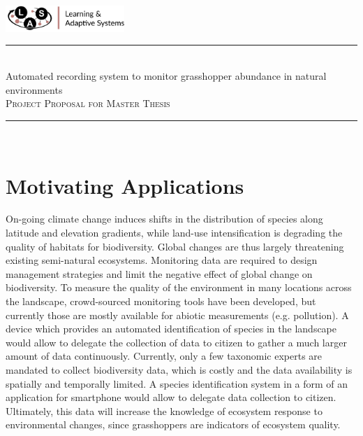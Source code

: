 \documentclass[paper=a4, fontsize=11pt]{scrartcl}
\newcommand{\horrule}[1]{\rule{\linewidth}{#1}}
\begin{document}
\includegraphics[height=1.0cm]{lascropped}%
\hfill%
{
\centering
\normalfont \normalsize 
\horrule{0.5pt} \\[0.2cm] 
\huge Automated recording system to monitor grasshopper abundance in natural environments
\\[0.3cm]
\normalfont \normalsize 
\textsc{Project Proposal for Master Thesis}
\horrule{2pt} \\[0.6cm] 
}
\section*{Motivating Applications}

On-going climate change induces shifts in the distribution of species along latitude and elevation gradients, while land-use intensification is degrading the quality of habitats for biodiversity. Global changes are thus largely threatening existing semi-natural ecosystems. Monitoring data are required to design management strategies and limit the negative effect of global change on biodiversity. To measure the quality of the environment in many locations across the landscape, crowd-sourced monitoring tools have been developed, but currently those are mostly available for abiotic measurements (e.g. pollution). A device which provides an automated identification of species in the landscape would allow to delegate the collection of data to citizen to gather a much larger amount of data continuously. Currently, only a few taxonomic experts are mandated to collect biodiversity data, which is costly and the data availability is spatially and temporally limited. A species identification system in a form of an application for smartphone would allow to delegate data collection to citizen. Ultimately, this data will increase the knowledge of ecosystem response to environmental changes, since grasshoppers are indicators of ecosystem quality.
\end{document}
